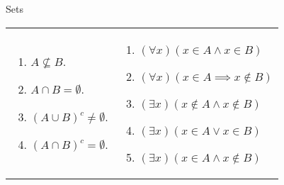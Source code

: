 \begin{section}{Sets}
\begin{problem}
\begin{tabular}{@{}ll}
\begin{minipage}[l]{3.25in}
\begin{enumerate}[label=\textrm{(\alph*)}]
\item $A \nsubseteq B$. 
\item $A \cap B= \emptyset$. 
\item $(A \cup B)^{c} \neq \emptyset$. 
\item $(A \cap B)^{c} = \emptyset$.
\end{enumerate}
\end{minipage}
 &
\begin{minipage}[l]{3.25in}
\begin{enumerate}[label=\textrm{(\roman*)}]
\item $(\forall x)(x \in A \wedge x \in B)$ 
\item $(\forall x)(x \in A \implies x \notin B)$ 
\item $(\exists x)(x \notin A \wedge x \notin B)$
\item $(\exists x)(x \in A \vee x \in B)$
\item $(\exists x)(x \in A \wedge x\notin B)$
\end{enumerate}
\end{minipage}
\end{tabular}
\end{problem}

\end{section}